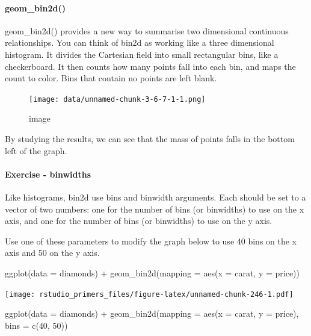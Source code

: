 \documentclass[
]{article}
\newenvironment{Shaded}{\begin{snugshade}}{\end{snugshade}}
\newcommand{\AttributeTok}[1]{\textcolor[rgb]{0.77,0.63,0.00}{#1}}
\newcommand{\DecValTok}[1]{\textcolor[rgb]{0.00,0.00,0.81}{#1}}
\newcommand{\FunctionTok}[1]{\textcolor[rgb]{0.00,0.00,0.00}{#1}}
\newcommand{\NormalTok}[1]{#1}
\newcommand{\SpecialCharTok}[1]{\textcolor[rgb]{0.00,0.00,0.00}{#1}}
\begin{document}
\hypertarget{geom_bin2d}{%
\paragraph{geom\_bin2d()}\label{geom_bin2d}}

geom\_bin2d() provides a new way to summarise two dimensional continuous
relationships. You can think of bin2d as working like a three
dimensional histogram. It divides the Cartesian field into small
rectangular bins, like a checkerboard. It then counts how many points
fall into each bin, and maps the count to color. Bins that contain no
points are left blank.

\begin{figure}
\centering
\texttt{[image: data/unnamed-chunk-3-6-7-1-1.png]}
\caption{image}
\end{figure}

By studying the results, we can see that the mass of points falls in the
bottom left of the graph.

\hypertarget{exercise---binwidths}{%
\paragraph{Exercise - binwidths}\label{exercise---binwidths}}

Like histograms, bin2d use bins and binwidth arguments. Each should be
set to a vector of two numbers: one for the number of bins (or
binwidths) to use on the x axis, and one for the number of bins (or
binwidths) to use on the y axis.

Use one of these parameters to modify the graph below to use 40 bins on
the x axis and 50 on the y axis.

\begin{Shaded}
\begin{Highlighting}[]
\FunctionTok{ggplot}\NormalTok{(}\AttributeTok{data =}\NormalTok{ diamonds) }\SpecialCharTok{+}
  \FunctionTok{geom\_bin2d}\NormalTok{(}\AttributeTok{mapping =} \FunctionTok{aes}\NormalTok{(}\AttributeTok{x =}\NormalTok{ carat, }\AttributeTok{y =}\NormalTok{ price))}
\end{Highlighting}
\end{Shaded}

\texttt{[image: rstudio\_primers\_files/figure-latex/unnamed-chunk-246-1.pdf]}

\begin{Shaded}
\begin{Highlighting}[]
\FunctionTok{ggplot}\NormalTok{(}\AttributeTok{data =}\NormalTok{ diamonds) }\SpecialCharTok{+}
  \FunctionTok{geom\_bin2d}\NormalTok{(}\AttributeTok{mapping =} \FunctionTok{aes}\NormalTok{(}\AttributeTok{x =}\NormalTok{ carat, }\AttributeTok{y =}\NormalTok{ price), }\AttributeTok{bins =} \FunctionTok{c}\NormalTok{(}\DecValTok{40}\NormalTok{, }\DecValTok{50}\NormalTok{))}
\end{Highlighting}
\end{Shaded}
\end{document}
